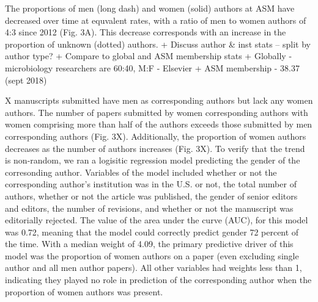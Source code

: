 \documentclass[11pt,]{article}
\begin{document}
The proportions of men (long dash) and women (solid) authors at ASM have
decreased over time at equvalent rates, with a ratio of men to women
authors of 4:3 since 2012 (Fig. 3A). This decrease corresponds with an
increase in the proportion of unknown (dotted) authors. + Discuss author
\& inst stats -- split by author type? + Compare to global and ASM
membership stats + Globally - microbiology researchers are 60:40, M:F -
Elsevier + ASM membership - 38.37 (sept 2018)

X manuscripts submitted have men as corresponding authors but lack any
women authors. The number of papers submitted by women corresponding
authors with women comprising more than half of the authors exceeds
those submitted by men corresponding authors (Fig. 3X). Additionally,
the proportion of women authors decreases as the number of authors
increases (Fig. 3X). To verify that the trend is non-random, we ran a
logisitic regression model predicting the gender of the corresonding
author. Variables of the model included whether or not the corresponding
author's institution was in the U.S. or not, the total number of
authors, whether or not the article was published, the gender of senior
editors and editors, the number of revisions, and whether or not the
manuscript was editorially rejected. The value of the area under the
curve (AUC), for this model was 0.72, meaning that the model could
correctly predict gender 72 percent of the time. With a median weight of
4.09, the primary predictive driver of this model was the proportion of
women authors on a paper (even excluding single author and all men
author papers). All other variables had weights less than 1, indicating
they played no role in prediction of the corresponding author when the
proportion of women authors was present.
\end{document}
